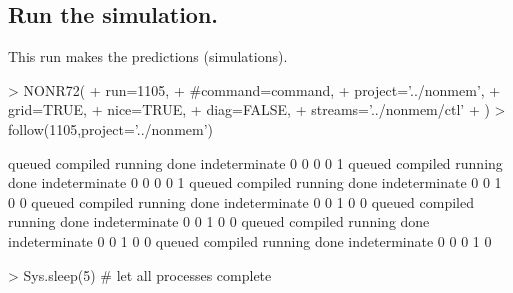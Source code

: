 \subsection{Run the simulation.}
This run makes the predictions (simulations).
\begin{Schunk}
\begin{Sinput}
> NONR72(
+      run=1105,
+      #command=command,
+      project='../nonmem',
+      grid=TRUE,
+      nice=TRUE,
+      diag=FALSE,
+      streams='../nonmem/ctl'
+ )
> follow(1105,project='../nonmem')
\end{Sinput}
\begin{Soutput}
       queued      compiled       running          done indeterminate 
            0             0             0             0             1 
       queued      compiled       running          done indeterminate 
            0             0             0             0             1 
       queued      compiled       running          done indeterminate 
            0             0             1             0             0 
       queued      compiled       running          done indeterminate 
            0             0             1             0             0 
       queued      compiled       running          done indeterminate 
            0             0             1             0             0 
       queued      compiled       running          done indeterminate 
            0             0             1             0             0 
       queued      compiled       running          done indeterminate 
            0             0             0             1             0 
\end{Soutput}
\begin{Sinput}
> Sys.sleep(5) # let all processes complete
\end{Sinput}
\end{Schunk}
